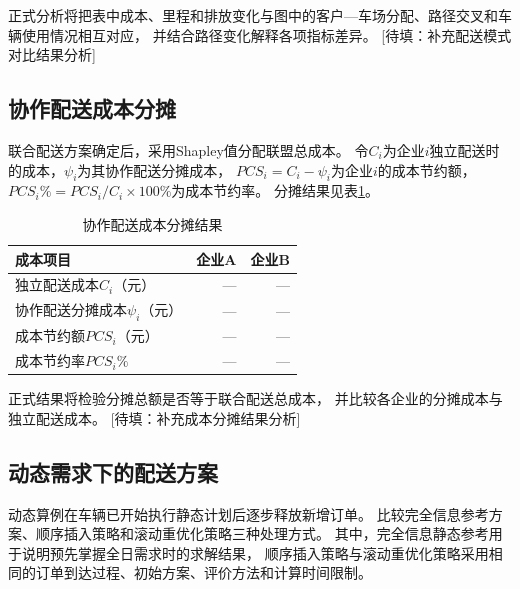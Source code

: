 \documentclass{setp-new}
\DeclareRobustCommand{\TBD}[1]{%
  \textcolor{black!65}{[待填：#1]}}
\begin{document}
正式分析将把表中成本、里程和排放变化与图中的客户—车场分配、路径交叉和车辆使用情况相互对应，
并结合路径变化解释各项指标差异。\TBD{补充配送模式对比结果分析}

\subsection{协作配送成本分摊}

联合配送方案确定后，采用Shapley值分配联盟总成本。
令$C_i$为企业$i$独立配送时的成本，$\psi_i$为其协作配送分摊成本，
$PCS_i=C_i-\psi_i$为企业$i$的成本节约额，$PCS_i\%=PCS_i/C_i\times100\%$为成本节约率。
分摊结果见表\ref{tab:allocation}。

\begin{table}[H]
  \centering
  \caption{协作配送成本分摊结果}
  \label{tab:allocation}
  \small
  \begin{tabular*}{0.72\textwidth}{@{\extracolsep{\fill}}lrr}
    \toprule
    成本项目 & 企业A & 企业B\\
    \midrule
    独立配送成本$C_i$（元） & --- & ---\\
    协作配送分摊成本$\psi_i$（元） & --- & ---\\
    成本节约额$PCS_i$（元） & --- & ---\\
    成本节约率$PCS_i\%$ & --- & ---\\
    \bottomrule
  \end{tabular*}
\end{table}

正式结果将检验分摊总额是否等于联合配送总成本，
并比较各企业的分摊成本与独立配送成本。\TBD{补充成本分摊结果分析}

\subsection{动态需求下的配送方案}

动态算例在车辆已开始执行静态计划后逐步释放新增订单。
比较完全信息参考方案、顺序插入策略和滚动重优化策略三种处理方式。
其中，完全信息静态参考用于说明预先掌握全日需求时的求解结果，
顺序插入策略与滚动重优化策略采用相同的订单到达过程、初始方案、评价方法和计算时间限制。
\end{document}
